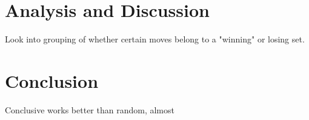 \documentclass{llncs}
\begin{document}
\section*{Analysis and Discussion} %


Look into grouping of whether certain moves belong to a "winning" or losing set.



\section*{Conclusion} %

Conclusive  works better than random, almost 
\end{document}
